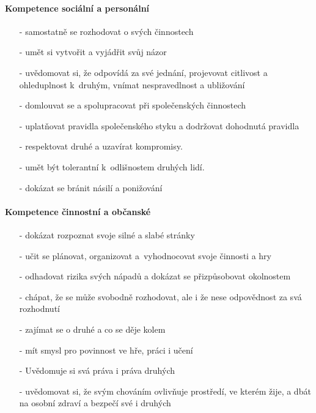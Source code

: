 				\paragraph{Kompetence sociální a personální}
				\begin{itemize}
				\setlength\itemsep{-2mm}
				\item[-] samostatně se rozhodovat o svých činnostech
				\item[-] umět si vytvořit a vyjádřit svůj názor
				\item[-] uvědomovat si, že odpovídá za své jednání, projevovat citlivost a ohleduplnost k druhým, vnímat nespravedlnost a ubližování
				\item[-] domlouvat se a spolupracovat při společenských činnostech
				\item[-] uplatňovat pravidla společenského styku a dodržovat dohodnutá pravidla 
				\item[-] respektovat druhé a uzavírat kompromisy. 
				\item[-] umět být tolerantní k odlišnostem druhých lidí.
				\item[-] dokázat se bránit násilí a ponižování
				\end{itemize}

				\paragraph{Kompetence činnostní a občanské}
				\begin{itemize}
				\setlength\itemsep{-2mm}
				\item[-] dokázat rozpoznat svoje silné a slabé stránky
				\item[-] učit se plánovat, organizovat a vyhodnocovat svoje činnosti a hry
				\item[-] odhadovat rizika svých nápadů a dokázat se přizpůsobovat okolnostem
				\item[-] chápat, že se může svobodně rozhodovat, ale i že nese odpovědnost za svá rozhodnutí
				\item[-] zajímat se o druhé a co se děje kolem
				\item[-] mít smysl pro povinnost ve hře, práci i učení
				\item[-] Uvědomuje si svá práva i práva druhých
				\item[-] uvědomovat si, že svým chováním ovlivňuje prostředí, ve kterém žije, a dbát na osobní zdraví a bezpečí své i druhých
				\end{itemize}



